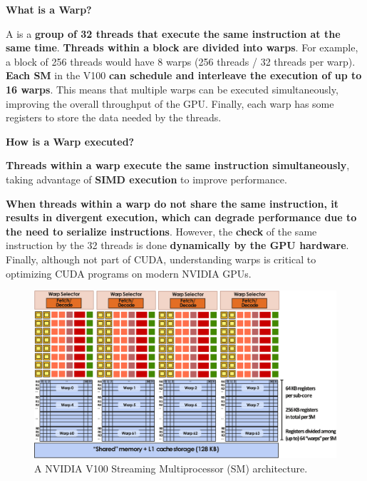 \begin{flushleft}
    \textcolor{Green3}{ \textbf{What is a Warp?}}
\end{flushleft}
A  is a \textbf{group of 32 threads that execute the same instruction at the same time}. \textbf{Threads within a block are divided into warps}. For example, a block of 256 threads would have 8 warps (256 threads / 32 threads per warp). \textbf{Each SM} in the V100 \textbf{can schedule and interleave the execution of up to 16 warps}. This means that multiple warps can be executed simultaneously, improving the overall throughput of the GPU. Finally, each warp has some registers to store the data needed by the threads.

\newpage

\begin{flushleft}
    \textcolor{Green3}{ \textbf{How is a Warp executed?}}
\end{flushleft}
\textbf{Threads within a warp execute the same instruction simultaneously}, taking advantage of \textbf{SIMD execution} to improve performance. 

\highspace
\textbf{When threads within a warp do not share the same instruction, it results in divergent execution, which can degrade performance due to the need to serialize instructions}. However, the \textbf{check} of the same instruction by the 32 threads is done \textbf{dynamically by the GPU hardware}. Finally, although not part of CUDA, understanding warps is critical to optimizing CUDA programs on modern NVIDIA GPUs.

\highspace
\begin{figure}[!htp]
    \centering
    \includegraphics[width=\textwidth]{img/nvidia-v100-sm-2.pdf}
    \caption{A NVIDIA V100 Streaming Multiprocessor (SM) architecture.}
\end{figure}
